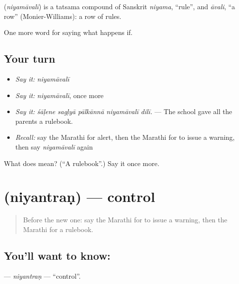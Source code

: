\begin{cousinweb}
\textbf{} (\emph{niyamāvalī}) is a tatsama compound of Sanskrit \emph{niyama}, \textquotedblleft{}rule\textquotedblright{}, and \emph{āvali}, \textquotedblleft{}a row\textquotedblright{} (Monier-Williams): a row of rules.
\end{cousinweb}

\begin{grammarlens}[title={What you've built}]
One more word for saying what happens if.
\end{grammarlens}

\subsection*{Your turn}
\begin{itemize}
\raggedright
  \item \emph{Say it:} \emph{niyamāvalī}
  \item \emph{Say it:} \emph{niyamāvalī}, once more
  \item \emph{Say it:} \emph{śāḷene sagḷyā pālkānnā niyamāvalī dilī.} — The school gave all the parents a rulebook.
  \item \emph{Recall:} say the Marathi for alert, then the Marathi for to issue a warning, then say \emph{niyamāvalī} again
\end{itemize}

\begin{tcolorbox}[breakable,colback=teal!4,colframe=teal!35!black,title={Before you move on}]
What does  mean? (\textquotedblleft{}A rulebook\textquotedblright{}.) Say it once more.
\end{tcolorbox}
\section[\texorpdfstring{\mr{नियंत्रण} (niyantraṇ)}{नियंत्रण (niyantraṇ)}]{ (niyantraṇ) — control}

\label{lesson:MR-C542-niyantran}



\begin{quote}
Before the new one: say the Marathi for to issue a warning, then the Marathi for a rulebook.
\end{quote}

\subsection*{You'll want to know: }
\textbf{} — \emph{niyantraṇ} — \textquotedblleft{}control\textquotedblright{}.

